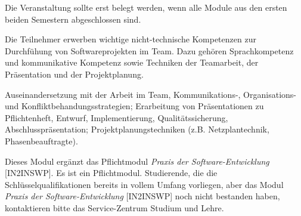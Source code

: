 \begin{module}
\begin{styleenv}
\begin{recommendations}Die Veranstaltung sollte erst belegt werden, wenn alle Module aus den ersten beiden Semestern abgeschlossen sind.

\end{recommendations}
\end{styleenv}

\begin{learningoutcomes}
Die Teilnehmer erwerben wichtige nicht-technische Kompetenzen zur Durchfühung von Softwareprojekten im Team. Dazu gehören Sprachkompetenz und kommunikative Kompetenz sowie Techniken der Teamarbeit, der Präsentation und der Projektplanung.


\end{learningoutcomes}

\begin{content}
Auseinandersetzung mit der Arbeit im Team, Kommunikations-, Organisations- und Konfliktbehandungsstrategien; Erarbeitung von Präsentationen zu Pflichtenheft, Entwurf, Implementierung, Qualitätssicherung, Abschlusspräsentation; Projektplanungstechniken (z.B. Netzplantechnik, Phasenbeauftragte).


\end{content}

\begin{remarks}Dieses Modul ergänzt das Pflichtmodul \emph{Praxis der Software-Entwicklung} [IN2INSWP]. Es ist ein Pflichtmodul. Studierende, die die Schlüsselqualifikationen bereits in vollem Umfang vorliegen, aber das Modul \emph{Praxis der Software-Entwicklung} [IN2INSWP] noch nicht bestanden haben, kontaktieren bitte das Service-Zentrum Studium und Lehre.

\end{remarks}

\end{module}

